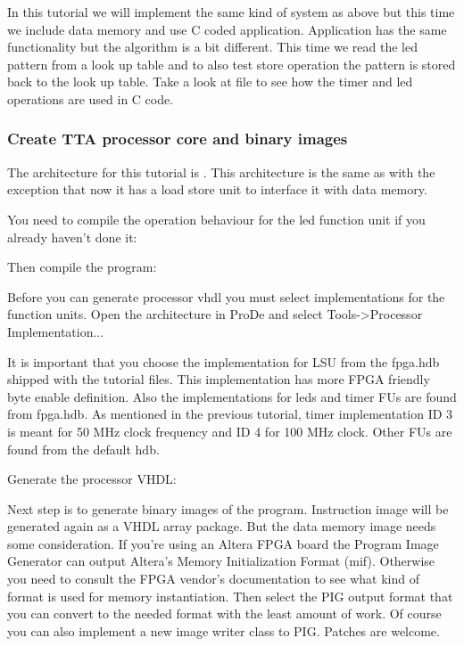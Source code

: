 \documentclass[a4paper,twoside]{tceusermanual}
\begin{document}
In this tutorial we will implement the same kind of system as above but this
time we include data memory and use C coded application. Application has
the same functionality but the algorithm is a bit different. This time we read the
led pattern from a look up table and to also test store operation the pattern
is stored back to the look up table. Take a look at file 
to see how the timer and led operations are used in C code.

\subsubsection{Create TTA processor core and binary images}

The architecture for this tutorial is . This architecture
is the same as  with the exception that now it has a load
store unit to interface it with data memory.

You need to compile the operation behaviour for the led function unit if you
already haven't done it:


Then compile the program:


Before you can generate processor vhdl you must select implementations for
the function units. Open the architecture in ProDe and select Tools->Processor
Implementation...


It is important that you choose the implementation for LSU from the fpga.hdb
shipped with the tutorial files. This implementation has more FPGA friendly
byte enable definition. Also the implementations for leds and timer FUs are
found from fpga.hdb. As mentioned in the previous tutorial, timer
implementation ID 3 is meant for 50 MHz clock frequency and ID 4 for 100 MHz
clock. Other FUs are found from the default hdb.


Generate the processor VHDL:


Next step is to generate binary images of the program. Instruction image will
be generated again as a VHDL array package. But the data memory image needs
some consideration. If you're using an Altera FPGA board the Program Image
Generator can output Altera's Memory Initialization Format (mif).
Otherwise you need to consult the FPGA vendor's documentation to see what kind
of format is used for memory instantiation. Then select the PIG output format
that you can convert to the needed format with the least amount of work. Of
course you can also implement a new image writer class to PIG. Patches are
welcome.
\end{document}
